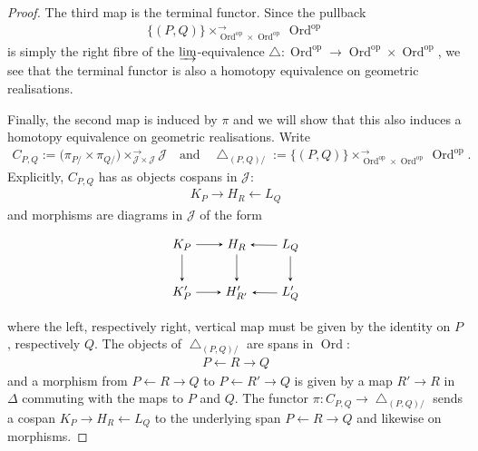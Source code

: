 \documentclass[12pt, reqno]{amsart}
\theoremstyle{plain}
\theoremstyle{definition}
\begin{document}
\begin{proof}
The third map is the terminal functor. Since the pullback 
\begin{align*}
\{(P,Q)\}\mathop{\times}^{\rightarrow}_{\operatorname{Ord}^{\operatorname{op}}\times \operatorname{Ord}^{\operatorname{op}}} \operatorname{Ord}^{\operatorname{op}}
\end{align*}
is simply the right fibre of the $\varinjlim$-equivalence $\bigtriangleup\colon \operatorname{Ord}^{\operatorname{op}}\rightarrow \operatorname{Ord}^{\operatorname{op}}\times \operatorname{Ord}^{\operatorname{op}}$, we see that the terminal functor is also a homotopy equivalence on geometric realisations.

Finally, the second map is induced by $\pi$ and we will show that this also induces a homotopy equivalence on geometric realisations. 
Write
\begin{align*}
C_{P,Q}:=\big( \pi_{P/}\times \pi_{Q/}\big)\mathop{\times}^{\rightarrow}_{\mathcal{J}\times \mathcal{J}} \mathcal{J}\quad\text{and}\quad \bigtriangleup_{(P,Q)/}:= \{(P,Q)\}\mathop{\times}^{\rightarrow}_{\operatorname{Ord}^{\operatorname{op}}\times \operatorname{Ord}^{\operatorname{op}}} \operatorname{Ord}^{\operatorname{op}}.
\end{align*}
Explicitly, $C_{P,Q}$ has as objects cospans in $\mathcal{J}$:
\begin{align*}
K_P\rightarrow H_R\leftarrow L_Q
\end{align*}
and morphisms are diagrams in $\mathcal{J}$ of the form
\begin{equation}\label{morphism in CPQ}
\begin{tikzpicture}[baseline=(current  bounding  box.center)]
\matrix (m) [matrix of math nodes,row sep=2em,column sep=2em]
{
K_P & H_R & L_Q\\
K'_P & H'_{R'} & L'_Q\\
};
\path[-stealth]
(m-1-1) edge (m-1-2) edge (m-2-1)
(m-1-2) edge (m-2-2)
(m-1-3) edge (m-1-2) edge (m-2-3)
(m-2-1) edge (m-2-2)
(m-2-3) edge (m-2-2)
;
\end{tikzpicture}
\end{equation}
where the left, respectively right, vertical map must be given by the identity on $P$, respectively $Q$. The objects of $\bigtriangleup_{(P,Q)/}$ are spans in $\operatorname{Ord}$:
\begin{align*}
P\leftarrow R\rightarrow Q
\end{align*}
and a morphism from $P\leftarrow R\rightarrow Q$ to $P\leftarrow R'\rightarrow Q$ is given by a map $R'\rightarrow R$ in $\Delta$ commuting with the maps to $P$ and $Q$. The functor $\pi\colon C_{P,Q}\rightarrow \bigtriangleup_{(P,Q)/}$ sends a cospan $K_P\rightarrow H_R\leftarrow L_Q$ to the underlying span $P\leftarrow R\rightarrow Q$ and likewise on morphisms.


\end{proof}
\end{document}
